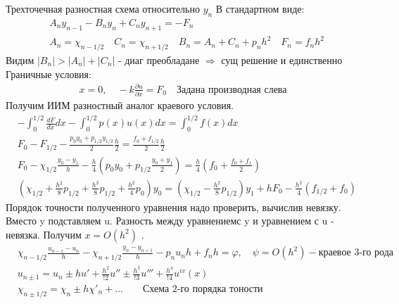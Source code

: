 \documentclass[12pt,a4paper]{article}
\begin{document}
	Трехточечная разностная схема относительно $y_n$ В стандартном виде:\\
	\begin{align*}
	&A_n y_{n-1} - B_n y_n + C_n y_{n+1} = -F_n\\
	&A_n = \chi_{n-1/2} \quad C_n = \chi_{n+1/2} \quad B_n = A_n + C_n + p_n h^2 \quad F_n = f_n h^2
	\end{align*}
	Видим $|B_n| > |A_n| + |C_n|$ - диаг преобладане $\Rightarrow$ сущ решение и единственно\\
	Граничные условия:\\
	\begin{align*}
	x = 0, \quad -k\frac{\partial u}{\partial x} = F_0 \quad \text{Задана производная слева}
	\end{align*}	
	Получим ИИМ разностный аналог краевого условия.\\
	\begin{align*}
	&-\int_{0}^{1/2}\frac{dF}{dx}dx - \int_{0}^{1/2}p(x)u(x) dx = \int_{0}^{1/2}f(x)dx\\
	&F_0 - F_{1/2} - \frac{p_0 y_0 + p_{1/2} y_{1/2}}{2}\frac{h}{2} = \frac{f_0 + f_{1/2}}{2}\frac{h}{2}\\
	&F_0 - \chi_{1/2}\frac{y_0 - y_1}{h} - \frac{h}{4} (p_0 y_0 + p_{1/2}\frac{y_0 + y_1}{2}) = \frac{h}{4}\left( f_0 + \frac{f_0 + f_1}{2} \right) \\
	&\left(\chi_{1/2} + \frac{h^2}{8} p_{1/2} + \frac{h^2}{8} p_{1/2} + \frac{h^2}{4}p_0 \right) y_0 = \left( \chi_{1/2} - \frac{h^2}{8}p_{1/2}\right)y_1 + h F_0 - \frac{h^2}{4} (f_{1/2} + f_0)
	\end{align*}
	Порядок точности полученного уравнения надо проверить, вычислив невязку. Вместо y подставляем u. Разность между уравнениемс y и уравнением с u - невязка. Получим $x = O(h^2)$ . 
	\begin{align*}
	&\chi_{n-1/2} \frac{u_{n-1} - u_n}{h} - \chi_{n+1/2}\frac{y_n - y_{n+1}}{h} - p_n u_n h + f_n h = \varphi, \quad \psi = O(h^2) - \text{краевое 3-го рода}\\
	&u_{n\pm 1} = u_n \pm hu' + \frac{h^2}{!2}u'' \pm \frac{h^3}{!3}u''' + \frac{h^4}{!4}u^{iv}(x)\\
	&\chi_{n \pm 1/2} = \chi_n \pm h \chi'_n +... \qquad \text{Схема 2-го порядка тоности}
	\end{align*}
\end{document}
